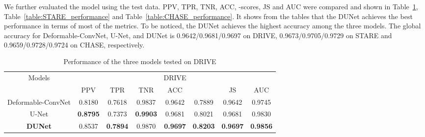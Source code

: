 \documentclass[journal]{IEEEtran}
\begin{document}
We further evaluated the model using the test data. PPV, TPR, TNR, ACC, -scores, JS and AUC were compared and shown in Table~\ref{table:DRIVE_performance}, Table~\ref{table:STARE_performance} and Table~\ref{table:CHASE_performance}. It shows from the tables that the DUNet achieves the best performance in terms of most of the metrics. To be noticed, the DUNet achieves the highest accuracy among the three models. The global accuracy for Deformable-ConvNet, U-Net, and DUNet is 0.9642/0.9681/0.9697 on DRIVE, 0.9673/0.9705/0.9729 on STARE and 0.9659/0.9728/0.9724 on CHASE, respectively.

\begin{table}[]
\caption{Performance of the three models tested on DRIVE}
\renewcommand\arraystretch{1.3}      
\renewcommand\tabcolsep{1.5pt} 
\begin{center}
\begin{tabular}{cccccccc}
\toprule
\multirow{2}{*}{Models} & \multicolumn{7}{c}{DRIVE}                                                                                                  \\ \cline{2-8} 
                        & PPV             & TPR             & TNR             & ACC             &               & JS              & AUC             \\ \hline
Deformable-ConvNet      & 0.8180           & 0.7618          & 0.9837          & 0.9642          & 0.7889          & 0.9642          & 0.9745          \\
U-Net                   & \textbf{0.8795} & 0.7373          & \textbf{0.9903} & 0.9681          & 0.8021          & 0.9681          & 0.9830           \\ 
\textbf{DUNet}                   & 0.8537          & \textbf{0.7894} & 0.9870           & \textbf{0.9697} & \textbf{0.8203} & \textbf{0.9697} & \textbf{0.9856} \\
\bottomrule 
\end{tabular}
\end{center}
\label{table:DRIVE_performance}
\end{table}
\end{document}
